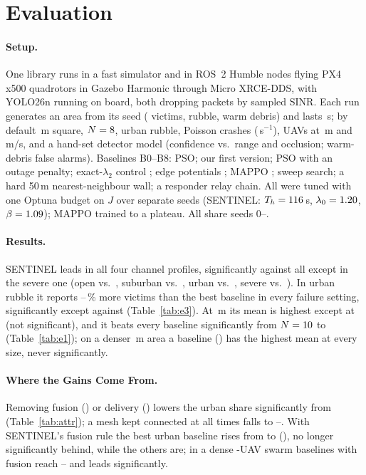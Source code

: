 \documentclass{IOS-Book-Article}
\newif\ifhighlight
\newenvironment{revised}{\ifhighlight\color{blue}\fi}{}
\begin{document}
\section{Evaluation}\label{sec:eval}



\begin{revised}
\paragraph{Setup.} One library runs in a fast simulator and in ROS~2 Humble nodes flying PX4 x500
quadrotors in Gazebo Harmonic through Micro XRCE-DDS, with YOLO26n running on board, both dropping
packets by sampled SINR. Each run generates an area from its seed
(\nVictims{} victims, rubble, warm debris) and lasts \nDuration\,s; by default \nArea\,m
square, $N=8$, urban rubble, Poisson crashes (\nFailRate\,s$^{-1}$), UAVs at \nAlt\,m and
\nVmax\,m/s, and a hand-set detector model (confidence vs.\ range and occlusion; warm-debris false
alarms). Baselines B0--B8: PSO; our first version; PSO with an outage penalty; exact-$\lambda_2$
control \cite{sabattini2013}; edge potentials \cite{ji2007}; MAPPO \cite{yu2022mappo}; sweep search; a
hard 50\,m nearest-neighbour wall; a responder relay chain. All were tuned with one Optuna budget on $J$
over separate seeds (SENTINEL: $T_h=116$\,s, $\lambda_0=1.20$, $\beta=1.09$); MAPPO trained to a plateau. All share seeds 0--\nSeedMax.

\paragraph{Results.} SENTINEL leads in all four channel profiles, significantly against all
except in the severe one (open \nChOpenS{} vs.\ \nChOpenB, suburban \nChSubS{} vs.\ \nChSubB, urban
\nChUrbS{} vs.\ \nChUrbB, severe \nChSevS{} vs.\ \nChSevB). In urban rubble it
reports \nEthreeGainLo--\nEthreeGainHi\,\% more victims than the best baseline in every failure setting,
significantly except against \nEthreeNotSig{} (Table~\ref{tab:e3}). At \nArea\,m its mean is highest
except at \nEoneFourNotTop{} (not significant), and it beats every baseline significantly from
$N=10$ to \nEoneNmax{} (Table~\ref{tab:e1}); on a denser \nDenseArea\,m area a baseline
(\nEoneTwoHundredTopNames) has the highest mean at every size, never significantly.
\end{revised}
\begin{revised}
\paragraph{Where the Gains Come From.} Removing fusion (\nUrbNofus) or delivery (\nUrbNodel) lowers
the urban share significantly from \nUrbS{} (Table~\ref{tab:attr}); a mesh kept connected at all times
falls to \nStrictLo--\nStrictHi. With SENTINEL's fusion rule the best urban baseline rises from
\nUrbBestOrig{} to \nUrbBestFus{} (\nUrbBestFusName), no longer significantly behind, while the others are; in a
dense \nDenseN-UAV swarm baselines with fusion reach \nDenseFusLo--\nDenseFusHi{} and \nDenseSigAbove{}
leads significantly.
\end{revised}
\end{document}
